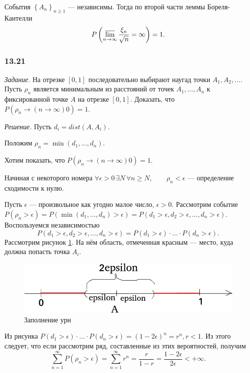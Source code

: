 События $ \left\{ A_n \right\}_{n \geq 1}$ --- независимы.
Тогда по второй части леммы Бореля-Кантелли
$$P \left( \varlimsup \limits_{n \to \infty } \frac{ \xi_n}{ \sqrt{n}} = \infty \right) =
1.$$

\subsubsection*{13.21}

\textit{Задание.} На отрезке $ \left[ 0, 1 \right] $ последовательно выбирают наугад точки $A_1, A_2, \dotsc $.
Пусть $ \rho_n$ является минимальным из расстояний от точек $A_1, \dotsc, A_n$ к фиксированной точке $A$ на отрезке $ \left[ 0, 1 \right] $.
Доказать, что $P \left( \rho_n \to \left( n \to \infty \right) 0 \right) = 1$.

\textit{Решение.} Пусть $d_i = dist \left( A, A_i \right) $.

Положим $ \rho_n = \min \left( d_1, \dotsc, d_n \right) $.

Хотим показать, что $P \left( \rho_n \to \left( n \to \infty \right) 0 \right) = 1$.

Начиная с некоторого номера $ \forall \epsilon > 0 \, \exists N \, \forall n \geq N, \qquad \rho_n < \epsilon $ --- определение сходимости к нулю.

Пусть $ \epsilon $ --- произвольное как угодно малое число, $ \epsilon > 0$.
Рассмотрим событие
$P \left( \rho_n > \epsilon \right) =
P \left( \min \left( d_1, \dotsc, d_n \right) > \epsilon \right) =
P \left( d_1 > \epsilon, d_2 > \epsilon, \dotsc, d_n > \epsilon \right) $.
Воспользуемся независимостью
$$P \left( d_1 > \epsilon, d_2 > \epsilon, \dotsc, d_n > \epsilon \right) =
P \left( d_1 > \epsilon \right) \cdot \dotsc \cdot P \left( d_n > \epsilon \right).$$
Рассмотрим рисунок \ref{fig:1321}.
На нём область, отмеченная красным --- место, куда должна попасть точка $A_i$.

\begin{figure}[h!]
  \centering
  \includegraphics[width=.4\textwidth]{./pictures/13_21.png}
  \caption{Заполнение урн}
  \label{fig:1321}
\end{figure}

Из рисунка $P \left( d_1 > \epsilon \right) \cdot \dotsc \cdot P \left( d_n > \epsilon \right) = \left( 1 - 2 \epsilon \right)^n = r^n, r < 1$.
Из этого следует, что если рассмотрим ряд, составленные из этих вероятностей, получим
$$ \sum \limits_{n=1}^{ \infty } P \left( \rho_n > \epsilon \right) = \sum \limits_{n=1}^{ \infty } r^n = \frac{r}{1-r} = \frac{1-2 \epsilon }{2 \epsilon } < + \infty.$$


